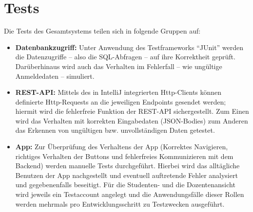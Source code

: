 \chapter{Tests}
Die Tests des Gesamtsystems teilen sich in folgende Gruppen auf:
\begin{itemize}
	\item \textbf{Datenbankzugriff:} Unter Anwendung des Testframeworks \enquote{JUnit} werden die Datenzugriffe -- also die SQL-Abfragen -- auf ihre Korrektheit geprüft. Darüberhinaus wird auch das Verhalten im Fehlerfall -- wie ungültige Anmeldedaten -- simuliert.
	\item \textbf{REST-API:} Mittels des in IntelliJ integrierten Http-Clients können definierte Http-Requests an die jeweiligen Endpoints gesendet werden; hiermit wird die fehlerfreie Funktion der REST-API sichergestellt. Zum Einen wird das Verhalten mit korrekten Eingabedaten (JSON-Bodies) zum Anderen das Erkennen von ungültigen bzw. unvollständigen Daten getestet.
	\item \textbf{App:} Zur Überprüfung des Verhaltens der App (Korrektes Navigieren, richtiges Verhalten der Buttons und fehlerfreies Kommunizieren mit dem Backend) werden manuelle Tests durchgeführt. Hierbei wird das alltägliche Benutzen der App nachgestellt und eventuell auftretende Fehler analysiert und gegebenenfalls beseitigt. Für die Studenten- und die Dozentenansicht wird jeweils ein Testaccount angelegt und die Anwendungsfälle dieser Rollen werden mehrmals pro Entwicklungsschritt zu Testzwecken ausgeführt.
\end{itemize}